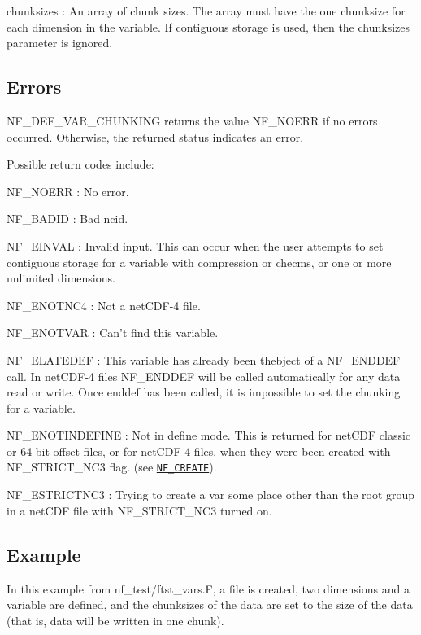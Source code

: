 {\ttfamily chunksizes} \+: An array of chunk sizes. The array must have the one chunksize for each dimension in the variable. If contiguous storage is used, then the chunksizes parameter is ignored.

\subsection*{Errors }

N\+F\+\_\+\+D\+E\+F\+\_\+\+V\+A\+R\+\_\+\+C\+H\+U\+N\+K\+I\+NG returns the value N\+F\+\_\+\+N\+O\+E\+RR if no errors occurred. Otherwise, the returned status indicates an error.

Possible return codes include\+:

{\ttfamily N\+F\+\_\+\+N\+O\+E\+RR} \+: No error.

{\ttfamily N\+F\+\_\+\+B\+A\+D\+ID} \+: Bad ncid.

{\ttfamily N\+F\+\_\+\+E\+I\+N\+V\+AL} \+: Invalid input. This can occur when the user attempts to set contiguous storage for a variable with compression or checms, or one or more unlimited dimensions.

{\ttfamily N\+F\+\_\+\+E\+N\+O\+T\+N\+C4} \+: Not a net\+C\+D\+F-\/4 file.

{\ttfamily N\+F\+\_\+\+E\+N\+O\+T\+V\+AR} \+: Can’t find this variable.

{\ttfamily N\+F\+\_\+\+E\+L\+A\+T\+E\+D\+EF} \+: This variable has already been thebject of a N\+F\+\_\+\+E\+N\+D\+D\+EF call. In net\+C\+D\+F-\/4 files N\+F\+\_\+\+E\+N\+D\+D\+EF will be called automatically for any data read or write. Once enddef has been called, it is impossible to set the chunking for a variable.

{\ttfamily N\+F\+\_\+\+E\+N\+O\+T\+I\+N\+D\+E\+F\+I\+NE} \+: Not in define mode. This is returned for net\+C\+DF classic or 64-\/bit offset files, or for net\+C\+D\+F-\/4 files, when they were been created with N\+F\+\_\+\+S\+T\+R\+I\+C\+T\+\_\+\+N\+C3 flag. (see \href{#NF_005fCREATE}{\tt N\+F\+\_\+\+C\+R\+E\+A\+TE}).

{\ttfamily N\+F\+\_\+\+E\+S\+T\+R\+I\+C\+T\+N\+C3} \+: Trying to create a var some place other than the root group in a net\+C\+DF file with N\+F\+\_\+\+S\+T\+R\+I\+C\+T\+\_\+\+N\+C3 turned on.

\subsection*{Example }

In this example from nf\+\_\+test/ftst\+\_\+vars.\+F, a file is created, two dimensions and a variable are defined, and the chunksizes of the data are set to the size of the data (that is, data will be written in one chunk).

